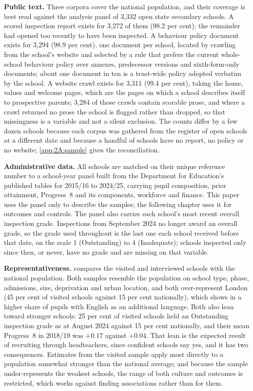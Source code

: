 \textbf{Public text.} Three corpora cover the national population, and their
coverage is best read against the analysis panel of 3,332 open state
secondary schools. A scored inspection report exists for 3,272 of them
(98.2 per cent); the remainder had opened too recently to have been
inspected. A behaviour policy document exists for 3,294 (98.9 per cent), one
document per school, located by crawling from the school's website and
selected by a rule that prefers the current whole-school behaviour policy over
annexes, predecessor versions and sixth-form-only documents; about one
document in ten is a trust-wide policy adopted verbatim by the school. A
website crawl exists for 3,311 (99.4 per cent), taking the home, values and
welcome pages, which are the pages on which a school describes itself to
prospective parents; 3,284 of those crawls contain scorable prose, and where a
crawl returned no prose the school is flagged rather than dropped, so that
missingness is a variable and not a silent exclusion. The counts differ by a
few dozen schools because each corpus was gathered from the register of open
schools at a different date and because a handful of schools have no report,
no policy or no website; \cref{app:2A:sample} gives the reconciliation.

\textbf{Administrative data.} All schools are matched on their unique
reference number to a school-year panel built from the Department for
Education's published tables for 2015/16 to 2024/25, carrying pupil
composition, prior attainment, Progress~8 and its components, workforce and
finance. This paper uses the panel only to describe the samples; the
following chapter uses it for outcomes and controls. The panel also carries
each school's most recent overall inspection grade. Inspections from
September 2024 no longer award an overall grade, so the grade used throughout
is the last one each school received before that date, on the scale 1
(Outstanding) to 4 (Inadequate); schools inspected only since then, or never,
have no grade and are missing on that variable.

\textbf{Representativeness.}  compares the
visited and interviewed schools with the national population. Both samples
resemble the population on school type, phase, admissions, size, deprivation
and urban location, and both over-represent London (45 per cent of visited
schools against 15 per cent nationally), which shows in a higher share of
pupils with English as an additional language. Both also lean toward stronger
schools: 25 per cent of visited schools held an Outstanding inspection grade
as at August 2024 against 15 per cent nationally, and their mean Progress~8
in 2018/19 was $+0.17$ against $+0.04$. That lean is the expected result of
recruiting through headteachers, since confident schools say yes, and it has
two consequences. Estimates from the visited sample apply most directly to a
population somewhat stronger than the national average; and because the
sample under-represents the weakest schools, the range of both culture and
outcomes is restricted, which works against finding associations rather than
for them.

